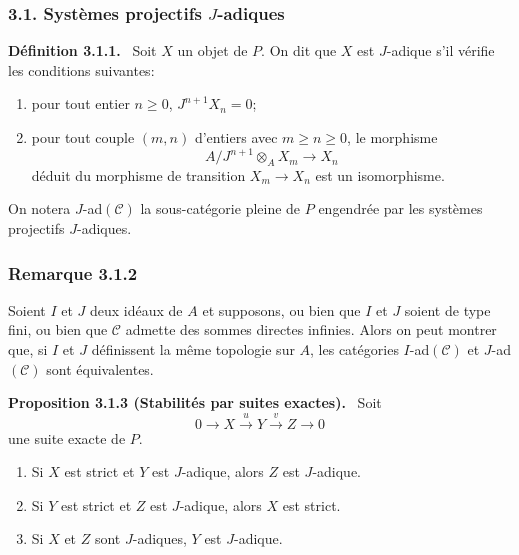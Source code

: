 \documentclass[11pt]{article}
\newenvironment{statement}[1]{\par\medskip\noindent\textbf{#1.}\ }{\par\medskip}
\providecommand{\cC}{\mathcal C}
\begin{document}
\subsubsection*{3.1. Systèmes projectifs $J$-adiques}
\begin{statement}{Définition 3.1.1}
Soit $X$ un objet de $P$. On dit que $X$ est $J$-adique s'il vérifie les conditions suivantes:
\begin{enumerate}[label=(\roman*)]
\item pour tout entier $n\ge0$, $J^{n+1}X_n=0$;
\item pour tout couple $(m,n)$ d'entiers avec $m\ge n\ge0$, le morphisme
\[
A/J^{n+1}\otimes_A X_m\longrightarrow X_n
\]
déduit du morphisme de transition $X_m\to X_n$ est un isomorphisme.
\end{enumerate}
\end{statement}
On notera $J$-ad$(\cC)$ la sous-catégorie pleine de $P$ engendrée par les systèmes projectifs $J$-adiques.

\subsubsection*{Remarque 3.1.2}
Soient $I$ et $J$ deux idéaux de $A$ et supposons, ou bien que $I$ et $J$ soient de type fini, ou bien que $\cC$ admette des sommes directes infinies. Alors on peut montrer que, si $I$ et $J$ définissent la même topologie sur $A$, les catégories $I$-ad$(\cC)$ et $J$-ad$(\cC)$ sont équivalentes.

\begin{statement}{Proposition 3.1.3 (Stabilités par suites exactes)}
Soit
\[
0\longrightarrow X\stackrel{u}{\longrightarrow}Y\stackrel{v}{\longrightarrow}Z\longrightarrow0
\]
une suite exacte de $P$.
\begin{enumerate}[label=(\roman*)]
\item Si $X$ est strict et $Y$ est $J$-adique, alors $Z$ est $J$-adique.
\item Si $Y$ est strict et $Z$ est $J$-adique, alors $X$ est strict.
\item Si $X$ et $Z$ sont $J$-adiques, $Y$ est $J$-adique.
\end{enumerate}
\end{statement}
\end{document}

